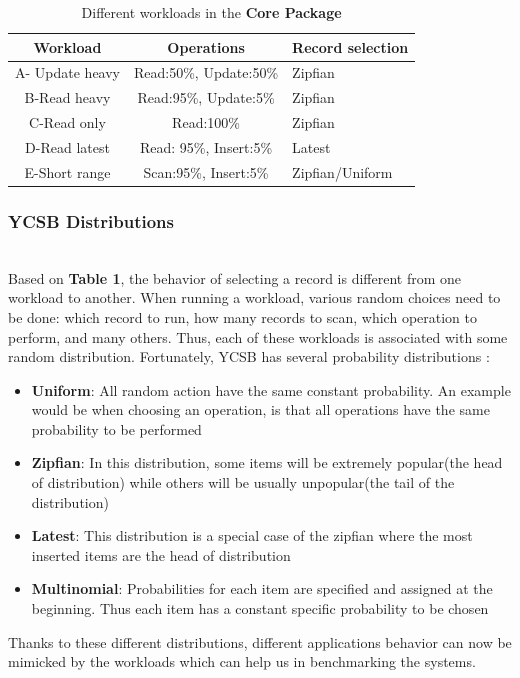 \documentclass[sigconf,10pt]{acmart}
\begin{document}
\begin{table}[h!]
  \caption{Different workloads in  the \textbf{Core Package}}
  \label{tab:freq}
  \begin{tabular}{ccl}
    \toprule
    Workload & Operations & Record selection \\ \hline
    \midrule
       A- Update heavy & Read:50\%, Update:50\% & Zipfian \\ \hline
    B-Read heavy & Read:95\%, Update:5\% & Zipfian \\    \hline
    C-Read only & Read:100\% & Zipfian \\    \hline
    D-Read latest & Read: 95\%, Insert:5\% & Latest \\ \hline
    E-Short range & Scan:95\%, Insert:5\% & Zipfian/Uniform \\ \hline
  \bottomrule
\end{tabular}
\end{table}
\subsubsection{ \textbf{YCSB Distributions}} \hfill\\
\newline
Based on \textbf{Table 1}, the behavior of selecting a record is different from one workload to another. When running a workload, various random choices need to be done: which record to run, how many records to scan, which operation to perform, and many others. Thus, each of these workloads is associated with some random distribution. Fortunately, YCSB has several probability distributions :
\begin{itemize}
  \item \textbf{Uniform}: All random action have the same constant probability. An example would be when  choosing an operation, is that all operations have the same probability to be  performed
  \item \textbf{Zipfian}: In this distribution, some items will be extremely popular(the head of distribution) while others will be usually unpopular(the tail of the distribution)
  \item \textbf{Latest}: This distribution is a special case of the zipfian  where the most inserted items are the head of distribution
  \item \textbf{Multinomial}: Probabilities for each item are specified and assigned at the beginning. Thus each item has a constant specific probability to be chosen
\end{itemize}
Thanks to these different distributions, different applications behavior can now be mimicked by the workloads which can help us in benchmarking the systems.
\end{document}

